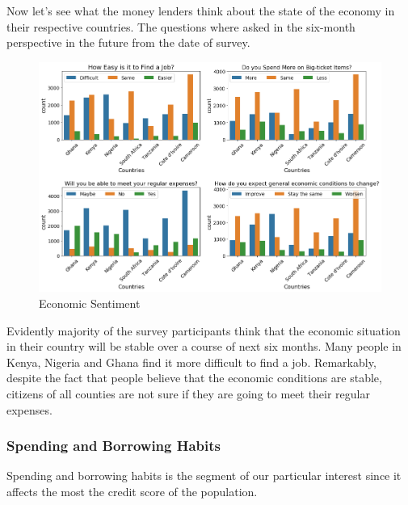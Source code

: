 Now let's see what the money lenders think about the state of the
economy in their respective countries. The questions where asked in the
six-month perspective in the future from the date of survey.

\begin{Schunk}
\begin{figure}[H]

{\centering \includegraphics[width=1.15\linewidth]{../../artifacts/sentiment} 

}

\caption[Economic Sentiment]{Economic Sentiment}\label{fig:esent}
\end{figure}
\end{Schunk}

Evidently majority of the survey participants think that the economic
situation in their country will be stable over a course of next six
months. Many people in Kenya, Nigeria and Ghana find it more difficult
to find a job. Remarkably, despite the fact that people believe that the
economic conditions are stable, citizens of all counties are not sure if
they are going to meet their regular expenses.

\hypertarget{spending-and-borrowing-habits}{%
\subsubsection{Spending and Borrowing
Habits}\label{spending-and-borrowing-habits}}

Spending and borrowing habits is the segment of our particular interest
since it affects the most the credit score of the population.

